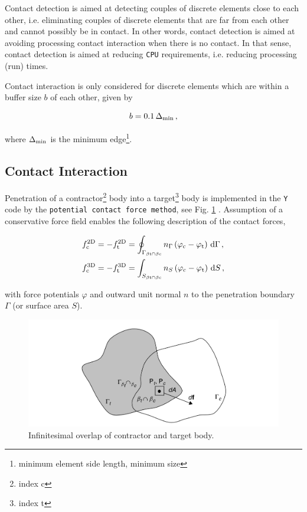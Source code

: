 \documentclass[format=acmtog,12pt,screen=true,review=false,natbib=false,]{acmart}
\begin{document}
\bigbreak
Contact detection is aimed at detecting couples of discrete elements close to each other, i.e. eliminating couples of discrete elements that are far from each other and cannot possibly be in contact. In other words, contact detection is aimed at avoiding processing contact interaction when there is no contact. In that sense, contact detection is aimed at reducing \texttt{CPU} requirements, i.e. reducing processing (run) times. \cite{Mun04}

\bigbreak
Contact interaction is only considered for discrete elements which are within a buffer size $b$ of each other, given by

\begin{equation}
    \label{eq:buff}
    b = 0.1\,\Delta_{\rm{min}}\,,
\end{equation}

where $\Delta_{\rm{min}}$ is the minimum edge\footnote{minimum element side length, minimum size}.

\subsection{Contact Interaction}

Penetration of a contractor\footnote{index c} body into a target\footnote{index t} body is implemented in the \texttt{Y} code by the \texttt{potential contact force method}, see Fig. \ref{fig:contact} \cite{Mun04}. Assumption of a conservative force field enables the following description of the contact forces,

\begin{align}
    f_{\rm{c}}^{\rm{2D}}&=-f_{\rm{t}}^{\rm{2D}}=\oint_{\Gamma_{\beta{\rm{t}}\cap\beta{\rm{c}}}}n_{\Gamma}\left(\varphi_{\rm{c}}-\varphi_{\rm{t}}\right)\,{\rm{d}}\Gamma\,,\\
    f_{\rm{c}}^{\rm{3D}}&=-f_{\rm{t}}^{\rm{3D}}=\int_{S_{\beta{\rm{t}}\cap\beta{\rm{c}}}}n_{S}\left(\varphi_{\rm{c}}-\varphi_{\rm{t}}\right)\,{\rm{d}}S\,,
\end{align}

with force potentials $\varphi$ and outward unit normal $n$ to the penetration boundary $\Gamma$ (or surface area $S$).

\begin{figure}[!htbp]
    \centering
    \includegraphics[width=\columnwidth]{Contact}
    \caption{Infinitesimal overlap of contractor and target body. \cite{Mun04}}
    \label{fig:contact}
\end{figure}
\end{document}
